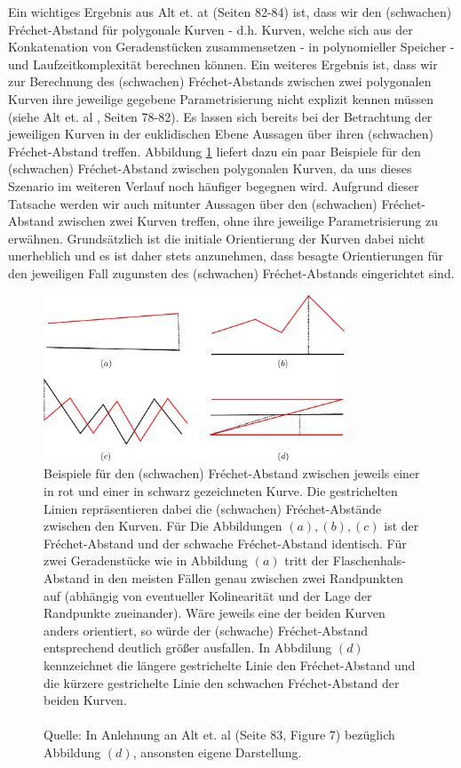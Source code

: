 \documentclass[a4paper, 12pt, twoside]{article}
\theoremstyle{Format1} %
\begin{document}
Ein wichtiges Ergebnis aus Alt et. at \cite{Alt} (Seiten 82-84) ist, dass wir den (schwachen) Fréchet-Abstand für polygonale Kurven - d.h. Kurven, welche sich aus der Konkatenation von Geradenstücken zusammensetzen - in
polynomieller Speicher - und Laufzeitkomplexität berechnen können. Ein weiteres Ergebnis ist,
dass wir zur Berechnung des (schwachen) Fréchet-Abstands zwischen zwei polygonalen Kurven ihre jeweilige gegebene Parametrisierung nicht explizit kennen müssen (siehe Alt et. al \cite{Alt}, Seiten 78-82).
Es lassen sich bereits bei der Betrachtung der jeweiligen Kurven in der euklidischen Ebene Aussagen über ihren (schwachen) Fréchet-Abstand treffen.
Abbildung \ref{frechet_example} liefert dazu ein paar Beispiele für den (schwachen) Fréchet-Abstand zwischen polygonalen Kurven, da uns dieses Szenario im weiteren Verlauf noch häufiger begegnen wird.
Aufgrund dieser Tatsache werden wir auch mitunter Aussagen über den (schwachen) Fréchet-Abstand zwischen zwei Kurven treffen, ohne ihre jeweilige Parametrisierung zu erwähnen.
Grundsätzlich ist die initiale Orientierung der Kurven dabei nicht unerheblich und es ist daher stets anzunehmen, dass besagte Orientierungen für den jeweiligen Fall zugunsten
des (schwachen) Fréchet-Abstands eingerichtet sind.

\begin{figure}[H]
    \centering
    \includegraphics[width=0.8\textwidth]{frechet_example.pdf}
    \caption{
	    Beispiele für den (schwachen) Fréchet-Abstand zwischen jeweils einer in rot und einer in schwarz gezeichneten Kurve. Die gestrichelten Linien repräsentieren dabei die (schwachen)
	    Fréchet-Abstände zwischen den Kurven. Für Die Abbildungen $(a),(b),(c)$ ist der Fréchet-Abstand und der schwache Fréchet-Abstand identisch.
	    Für zwei Geradenstücke wie in Abbildung $(a)$ tritt der Flaschenhals-Abstand
	    in den meisten Fällen genau zwischen zwei Randpunkten auf (abhängig von eventueller Kolinearität und der Lage der Randpunkte zueinander).
	    Wäre jeweils eine der beiden Kurven anders orientiert, so würde der (schwache) Fréchet-Abstand entsprechend deutlich größer ausfallen.
	    In Abbdilung $(d)$ kennzeichnet die längere gestrichelte Linie den Fréchet-Abstand und die kürzere gestrichelte Linie den schwachen Fréchet-Abstand der beiden Kurven.
	    \\
	    \\
	    Quelle: In Anlehnung an Alt et. al \cite{Alt} (Seite 83, Figure 7) bezüglich Abbildung $(d)$, ansonsten eigene Darstellung.
    }
    \label{frechet_example}
\end{figure}
\end{document}
